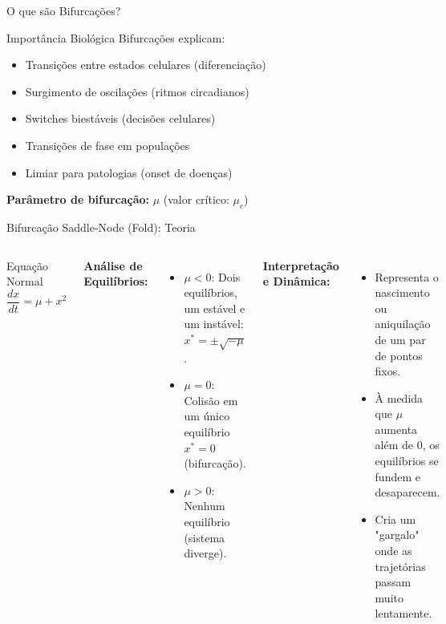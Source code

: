 \begin{frame}[allowframebreaks]{O que são Bifurcações?}

\vspace{0.3cm}

\begin{exampleblock}{Importância Biológica}
Bifurcações explicam:
\begin{itemize}
    \item Transições entre estados celulares (diferenciação)
    \item Surgimento de oscilações (ritmos circadianos)
    \item Switches biestáveis (decisões celulares)
    \item Transições de fase em populações
    \item Limiar para patologias (onset de doenças)
\end{itemize}
\end{exampleblock}

\vspace{0.3cm}

\textbf{Parâmetro de bifurcação:} $\mu$ (valor crítico: $\mu_c$)
\end{frame}

\begin{frame}{Bifurcação Saddle-Node (Fold): Teoria}
\begin{columns}
\begin{block}{Equação Normal}
\begin{equation*}
\frac{dx}{dt} = \mu + x^2
\end{equation*}
\end{block}

\textbf{Análise de Equilíbrios:}
\begin{itemize}
    \item $\mu < 0$: Dois equilíbrios, um estável e um instável: $x^* = \pm\sqrt{-\mu}$.
    \item $\mu = 0$: Colisão em um único equilíbrio $x^* = 0$ (bifurcação).
    \item $\mu > 0$: Nenhum equilíbrio (sistema diverge).
\end{itemize}

\textbf{Interpretação e Dinâmica:}
\begin{itemize}
    \item Representa o nascimento ou aniquilação de um par de pontos fixos.
    \item À medida que $\mu$ aumenta além de 0, os equilíbrios se fundem e desaparecem.
    \item Cria um "gargalo" onde as trajetórias passam muito lentamente.
\end{itemize}
\end{columns}
\end{frame}

